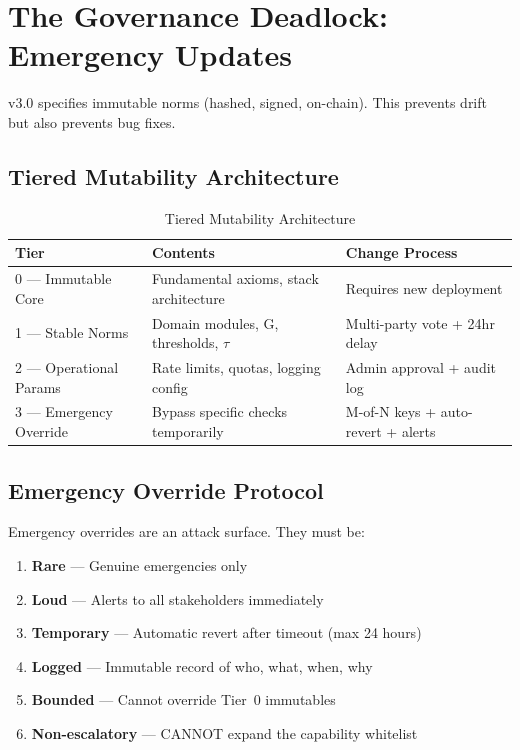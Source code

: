 \documentclass[11pt,letterpaper]{article}
\theoremstyle{definition}
\theoremstyle{remark}
\begin{document}
\section{The Governance Deadlock: Emergency Updates}

v3.0 specifies immutable norms (hashed, signed, on-chain). This prevents drift but also prevents bug fixes.

\subsection{Tiered Mutability Architecture}

\begin{table}[h]
\centering
\begin{tabular}{@{}lll@{}}
\toprule
\textbf{Tier} & \textbf{Contents} & \textbf{Change Process} \\
\midrule
0 --- Immutable Core & Fundamental axioms, stack architecture & Requires new deployment \\
1 --- Stable Norms & Domain modules, G, thresholds, $\tau$ & Multi-party vote + 24hr delay \\
2 --- Operational Params & Rate limits, quotas, logging config & Admin approval + audit log \\
3 --- Emergency Override & Bypass specific checks temporarily & M-of-N keys + auto-revert + alerts \\
\bottomrule
\end{tabular}
\caption{Tiered Mutability Architecture}
\end{table}

\subsection{Emergency Override Protocol}

Emergency overrides are an attack surface. They must be:
\begin{enumerate}
\item \textbf{Rare} --- Genuine emergencies only
\item \textbf{Loud} --- Alerts to all stakeholders immediately
\item \textbf{Temporary} --- Automatic revert after timeout (max 24 hours)
\item \textbf{Logged} --- Immutable record of who, what, when, why
\item \textbf{Bounded} --- Cannot override Tier~0 immutables
\item \textbf{Non-escalatory} --- CANNOT expand the capability whitelist
\end{enumerate}
\end{document}
